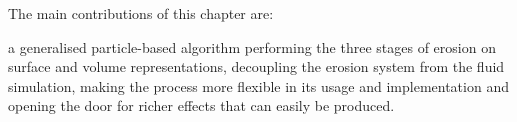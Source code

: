The main contributions of this chapter are:
\begin{Itemize}
\Item{} a generalised particle-based algorithm performing the three
stages of erosion on surface and volume representations,
\Item{} decoupling the erosion system from the fluid simulation, making the process more flexible in its usage and implementation and opening the door for richer effects that can easily be produced.
\end{Itemize}




